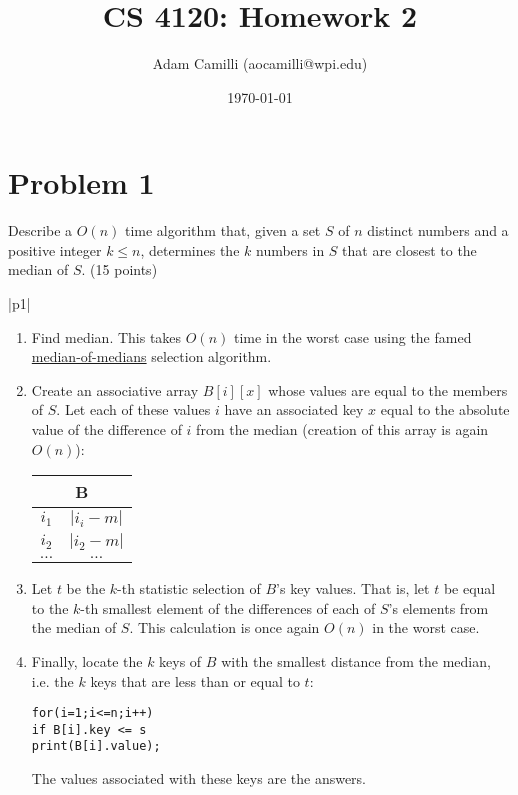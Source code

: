 \documentclass[10pt]{article}
\newenvironment{answer}
    {\begin{center}
    \begin{tabular}{|p{1\textwidth}|}
    \hline
    }
    { 
    \\\hline
    \end{tabular} 
    \end{center}
    }
\begin{document}
\title{CS 4120: Homework 2}
\author{Adam Camilli (aocamilli@wpi.edu)}
\date{\today}
\maketitle

\section*{Problem 1}
Describe a $O(n)$ time algorithm that, given a set $S$ of $n$ distinct numbers and a positive integer $k \le n$, determines the $k$ numbers in $S$ that are closest to the median of $S$. (15 points)
\begin{answer}
\begin{enumerate}
\item Find median. This takes $O(n)$ time in the worst case using the famed \href{https://tinyurl.com/yby5e74p}{median-of-medians} selection algorithm. 
\item Create an associative array $B[i][x]$ whose values are equal to the members of $S$. Let each of these values $i$ have an associated key $x$ equal to the absolute value of the difference of $i$ from the median (creation of this array is again $O(n)$):
  \begin{center}
    \begin{tabular}{|c|c|}
      \multicolumn{2}{c}{\textbf{B}} \\
      \hline
      $i_1$ & $\left| i_i - m \right|$ \\
      \hline
      $i_2$ & $\left| i_2 - m \right|$ \\
      \hline
      $\ldots$ & $\ldots$ \\
      \hline
    \end{tabular}
  \end{center}
\item Let $t$ be the $k$-th statistic selection of $B$'s key values. That is, let $t$ be equal to the $k$-th smallest element of the differences of each of $S$'s elements from the median of $S$. This calculation is once again $O(n)$ in the worst case.
\item Finally, locate the $k$ keys of $B$ with the smallest distance from the median, i.e. the $k$ keys that are less than or equal to $t$:
  \begin{center}
    \texttt{for(i=1;i<=n;i++)\\        
            \hspace{1cm}if B[i].key <= s\\           
            \hspace{3cm}print(B[i].value);\\}
  \end{center}
 The values associated with these keys are the answers. 
\end{enumerate}
\end{answer}
\end{document}
